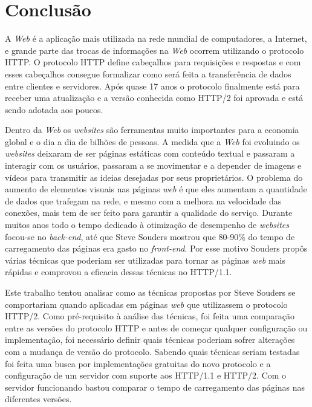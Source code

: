 %
%

\chapter{Conclusão}

A \textit{Web} é a aplicação mais utilizada na rede mundial de computadores, a Internet, e grande parte das trocas de informações na \textit{Web} ocorrem utilizando o protocolo HTTP. O protocolo HTTP define cabeçalhos para requisições e respostas e com esses cabeçalhos consegue formalizar como será feita a transferência de dados entre clientes e servidores. Após quase 17 anos o protocolo finalmente está para receber uma atualização e a versão conhecida como HTTP/2 foi aprovada e está sendo adotada aos poucos.

Dentro da \textit{Web} os \textit{websites} são ferramentas muito importantes para a economia global e o dia a dia de bilhões de pessoas. A medida que a \textit{Web} foi evoluindo os \textit{websites} deixaram de ser páginas estáticas com conteúdo textual e passaram a interagir com os usuários, passaram a se movimentar e a depender de imagens e vídeos para transmitir as ideias desejadas por seus proprietários. O problema do aumento de elementos visuais nas páginas \textit{web} é que eles aumentam a quantidade de dados que trafegam na rede, e mesmo com a melhora na velocidade das conexões, mais tem de ser feito para garantir a qualidade do serviço. Durante muitos anos todo o tempo dedicado à otimização de desempenho de \textit{websites} focou-se no \textit{back-end}, até que Steve Souders mostrou que 80-90\% do tempo de carregamento das páginas era gasto no \textit{front-end}. Por esse motivo Souders propôs várias técnicas que poderiam ser utilizadas para tornar as páginas \textit{web} mais rápidas e comprovou a eficacia dessas técnicas no HTTP/1.1.

Este trabalho tentou analisar como as técnicas propostas por Steve Souders se comportariam quando aplicadas em páginas \textit{web} que utilizassem o protocolo HTTP/2. Como pré-requisito à análise das técnicas, foi feita uma comparação entre as versões do protocolo HTTP e antes de começar qualquer configuração ou implementação, foi necessário definir quais técnicas poderiam sofrer alterações com a mudança de versão do protocolo. Sabendo quais técnicas seriam testadas foi feita uma busca por implementações gratuitas do novo protocolo e a configuração de um servidor com suporte aos HTTP/1.1 e HTTP/2. Com o servidor funcionando bastou comparar o tempo de carregamento das páginas nas diferentes versões.

